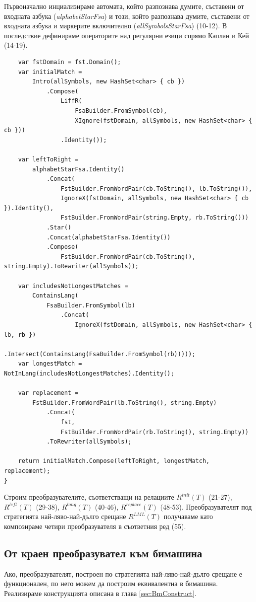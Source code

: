 \documentclass[12pt, oneside]{article}
\theoremstyle{definition}
\begin{document}
Първоначално инциализираме автомата, който разпознава думите, съставени от входната азбука (\emph{alphabetStarFsa}) и този, който разпознава думите, съставени от входната азбука и маркерите включително (\emph{allSymbolsStarFsa}) (10-12). В последствие дефинираме операторите над регулярни езици спрямо Каплан и Кей \cite{Kaplan&Kay:94} (14-19).

\begin{verbatim}
	var fstDomain = fst.Domain();
	var initialMatch =
		Intro(allSymbols, new HashSet<char> { cb })
			.Compose(
				LiffR(
					FsaBuilder.FromSymbol(cb),
					XIgnore(fstDomain, allSymbols, new HashSet<char> { cb }))
				.Identity());

	var leftToRight =
		alphabetStarFsa.Identity()
			.Concat(
				FstBuilder.FromWordPair(cb.ToString(), lb.ToString()),
				IgnoreX(fstDomain, allSymbols, new HashSet<char> { cb }).Identity(),
				FstBuilder.FromWordPair(string.Empty, rb.ToString()))
			.Star()
			.Concat(alphabetStarFsa.Identity())
			.Compose(
				FstBuilder.FromWordPair(cb.ToString(), string.Empty).ToRewriter(allSymbols));

	var includesNotLongestMatches =
		ContainsLang(
			FsaBuilder.FromSymbol(lb)
				.Concat(
					IgnoreX(fstDomain, allSymbols, new HashSet<char> { lb, rb })
						.Intersect(ContainsLang(FsaBuilder.FromSymbol(rb)))));
	var longestMatch = NotInLang(includesNotLongestMatches).Identity();

	var replacement =
		FstBuilder.FromWordPair(lb.ToString(), string.Empty)
			.Concat(
				fst,
				FstBuilder.FromWordPair(rb.ToString(), string.Empty))
			.ToRewriter(allSymbols);

	return initialMatch.Compose(leftToRight, longestMatch, replacement);
}
\end{verbatim}

Строим преобразувателите, съответстващи на релациите \( R^{init}(T) \) (21-27), \(R^{left}(T)\) (29-38), \(R^{long}(T)\) (40-46), \(R^{replace}(T) \) (48-53). Преобразувателят под стратегията най-ляво-най-дълго срещане \(R^{LML}(T)\) получаваме като композираме четири преобразувателя в съответния ред (55).

\subsection{От краен преобразувател към бимашина}

Ако, преобразувателят, построен по стратегията най-ляво-най-дълго срещане е функционален, по него можем да построим еквивалентна в бимашина. Реализираме конструкцията описана в глава \ref{sec:BmConstruct}.
\end{document}
